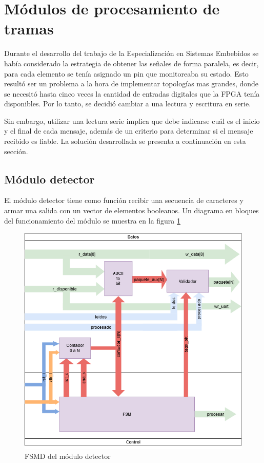 \section{Módulos de procesamiento de tramas}

	Durante el desarrollo del trabajo de la Especialización en Sistemas Embebidos se había considerado la estrategia de obtener las señales de forma paralela, es decir, para cada elemento se tenía asignado un pin que monitoreaba su estado. Esto resultó ser un problema a la hora de implementar topologías mas grandes, donde se necesitó hasta cinco veces la cantidad de entradas digitales que la FPGA tenía disponibles. Por lo tanto, se decidió cambiar a una lectura y escritura en serie.
	
	Sin embargo, utilizar una lectura serie implica que debe indicarse cuál es el inicio y el final de cada mensaje, además de un criterio para determinar si el mensaje recibido es fiable. La solución desarrollada se presenta a continuación en esta sección.
	
	\subsection{Módulo detector}
	
		El módulo detector tiene como función recibir una secuencia de caracteres y armar una salida con un vector de elementos booleanos. Un diagrama en bloques del funcionamiento del módulo se muestra en la figura \ref{fig:FSMD_Detector}
		
		\begin{figure}[h]
		\centering
			\includegraphics[scale=.6]{./Figures/FSMD-Detector}
			\caption{FSMD del módulo detector}
			\label{fig:FSMD_Detector}
		\end{figure}
		
